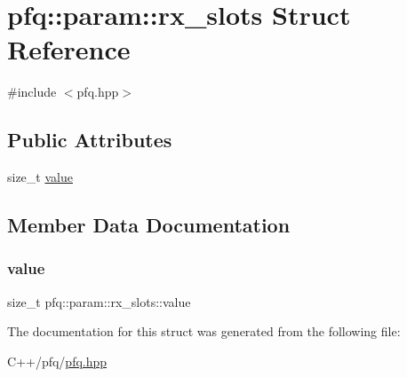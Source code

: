 \hypertarget{structpfq_1_1param_1_1rx__slots}{}\section{pfq\+:\+:param\+:\+:rx\+\_\+slots Struct Reference}
\label{structpfq_1_1param_1_1rx__slots}


{\ttfamily \#include $<$pfq.\+hpp$>$}

\subsection*{Public Attributes}
\begin{DoxyCompactItemize}
\item 
size\+\_\+t \hyperlink{structpfq_1_1param_1_1rx__slots_a2bafbed5d322cf89df33ca10bc397822}{value}
\end{DoxyCompactItemize}


\subsection{Member Data Documentation}
\mbox{\label{structpfq_1_1param_1_1rx__slots_a2bafbed5d322cf89df33ca10bc397822}} 
\subsubsection{\texorpdfstring{value}{value}}
{\footnotesize\ttfamily size\+\_\+t pfq\+::param\+::rx\+\_\+slots\+::value}



The documentation for this struct was generated from the following file\+:\begin{DoxyCompactItemize}
\item 
C++/pfq/\hyperlink{pfq_8hpp}{pfq.\+hpp}\end{DoxyCompactItemize}
